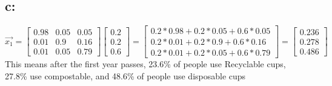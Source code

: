 \documentclass{article}
\begin{document}
\subsection*{c: }
$\vec{x_1}=\begin{bmatrix}0.98&0.05&0.05\\0.01&0.9&0.16\\0.01&0.05&0.79\end{bmatrix}\begin{bmatrix}0.2\\0.2\\0.6\end{bmatrix} = \begin{bmatrix}0.2*0.98+0.2*0.05+0.6*0.05\\0.2*0.01+0.2*0.9+0.6*0.16\\0.2*0.01+0.2*0.05+0.6*0.79\end{bmatrix}=\begin{bmatrix}0.236\\0.278\\0.486 \end{bmatrix}$
\\This means after the first year passes, 23.6\% of people use Recyclable cups, 27.8\% use compostable, and 48.6\% of people use disposable cups
\pagebreak
\end{document}
